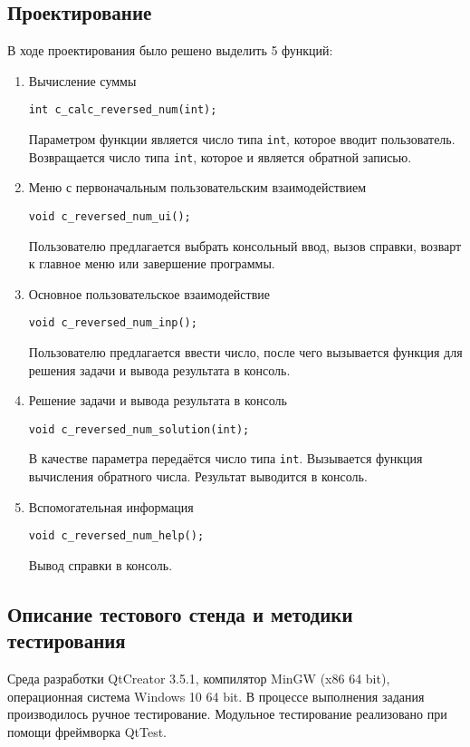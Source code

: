 \documentclass[12pt,a4paper]{report}
\begin{document}
\subsection{Проектирование}
\hspace{\parindent}В ходе проектирования было решено выделить 5 функций:
\begin{enumerate}
 	\item Вычисление суммы
 	
 	\verb+int c_calc_reversed_num(int);+
 	
	Параметром функции является число типа \verb+int+, которое вводит пользователь.
	Возвращается число типа \verb+int+, которое и является обратной записью.	 
		 
		 
	\item Меню с первоначальным пользовательским взаимодействием
	
	\verb+void c_reversed_num_ui();+
	
	Пользователю предлагается выбрать консольный ввод, вызов справки, возварт к главное меню или завершение программы.	
		 
		 
	\item Основное пользовательское взаимодействие
	
	\verb+void c_reversed_num_inp();+

	Пользователю предлагается ввести число, после чего вызывается функция для решения задачи и вывода результата в консоль.
	
	
	\item Решение задачи и вывода результата в консоль
	
	\verb+void c_reversed_num_solution(int);+

	В качестве параметра передаётся число типа \verb+int+. Вызывается функция вычисления обратного числа. Результат выводится в консоль.	
	
	 
	\item Вспомогательная информация
	
	\verb+void c_reversed_num_help();+
	
	Вывод справки в консоль.
\end{enumerate}

\subsection{Описание тестового стенда и методики тестирования}
\hspace{\parindent}Среда разработки QtCreator 3.5.1, компилятор MinGW (x86 64 bit), операционная система Windows 10 64 bit.
В процессе выполнения задания производилось ручное тестирование.
Модульное тестирование реализовано при помощи фреймворка QtTest.
\end{document}
